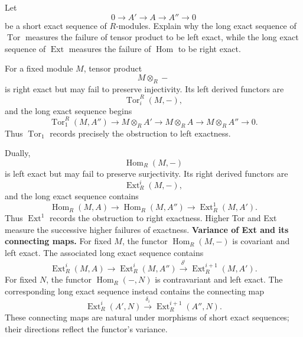 \begin{problem}[CP-V-0114]
\label{prob:cp-v-0114}
Let
\[
0\to A'\to A\to A''\to0
\]
be a short exact sequence of \(R\)-modules. Explain why the long exact sequence of \(\operatorname{Tor}\) measures the failure of tensor product to be left exact, while the long exact sequence of \(\operatorname{Ext}\) measures the failure of \(\operatorname{Hom}\) to be right exact.
\end{problem}

\begin{solution}
For a fixed module \(M\), tensor product
\[
M\otimes_R-
\]
is right exact but may fail to preserve injectivity. Its left derived functors are
\[
\operatorname{Tor}_i^R(M,-),
\]
and the long exact sequence begins
\[
\operatorname{Tor}_1^R(M,A'')\to M\otimes_R A'\to M\otimes_R A\to M\otimes_R A''\to0.
\]
Thus \(\operatorname{Tor}_1\) records precisely the obstruction to left exactness.

Dually,
\[
\operatorname{Hom}_R(M,-)
\]
is left exact but may fail to preserve surjectivity. Its right derived functors are
\[
\operatorname{Ext}_R^i(M,-),
\]
and the long exact sequence contains
\[
\operatorname{Hom}_R(M,A)\to\operatorname{Hom}_R(M,A'')
\to\operatorname{Ext}_R^1(M,A').
\]
Thus \(\operatorname{Ext}^1\) records the obstruction to right exactness. Higher Tor and Ext measure the successive higher failures of exactness.
\medskip
\noindent\textbf{Variance of Ext and its connecting maps.}
For fixed $M$, the functor $\operatorname{Hom}_R(M,-)$ is covariant
and left exact. The associated long exact sequence contains
\[
\operatorname{Ext}_R^i(M,A)
\longrightarrow\operatorname{Ext}_R^i(M,A'')
\xrightarrow{\delta^i}\operatorname{Ext}_R^{i+1}(M,A').
\]
For fixed $N$, the functor $\operatorname{Hom}_R(-,N)$ is
contravariant and left exact. The corresponding long exact sequence
instead contains the connecting map
\[
\operatorname{Ext}_R^i(A',N)
\xrightarrow{\delta_i}\operatorname{Ext}_R^{i+1}(A'',N).
\]
These connecting maps are natural under morphisms of short exact
sequences; their directions reflect the functor's variance.

\end{solution}
